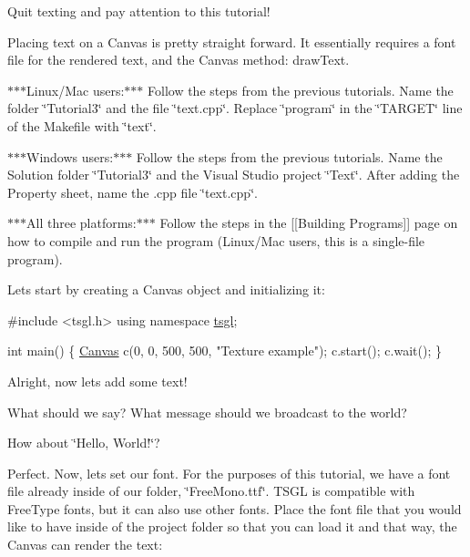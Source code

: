 Quit texting and pay attention to this tutorial!

Placing text on a Canvas is pretty straight forward. It essentially requires a font file for the rendered text, and the Canvas method\+: draw\+Text.

$\ast$$\ast$$\ast$\+Linux/\+Mac users\+:$\ast$$\ast$$\ast$ Follow the steps from the previous tutorials. Name the folder \char`\"{}\+Tutorial3\char`\"{} and the file \char`\"{}text.\+cpp\char`\"{}. Replace \char`\"{}program\char`\"{} in the \char`\"{}\+T\+A\+R\+G\+E\+T\char`\"{} line of the Makefile with \char`\"{}text\char`\"{}.

$\ast$$\ast$$\ast$\+Windows users\+:$\ast$$\ast$$\ast$ Follow the steps from the previous tutorials. Name the Solution folder \char`\"{}\+Tutorial3\char`\"{} and the Visual Studio project \char`\"{}\+Text\char`\"{}. After adding the Property sheet, name the .cpp file \char`\"{}text.\+cpp\char`\"{}.

$\ast$$\ast$$\ast$\+All three platforms\+:$\ast$$\ast$$\ast$ Follow the steps in the \mbox{[}\mbox{[}Building Programs\mbox{]}\mbox{]} page on how to compile and run the program (Linux/\+Mac users, this is a single-\/file program).

Let\textquotesingle{}s start by creating a Canvas object and initializing it\+:


\begin{DoxyCode}
\textcolor{preprocessor}{#include <tsgl.h>}
\textcolor{keyword}{using namespace }\hyperlink{namespacetsgl}{tsgl};

\textcolor{keywordtype}{int} main() \{
  \hyperlink{classtsgl_1_1_canvas}{Canvas} c(0, 0, 500, 500, \textcolor{stringliteral}{"Texture example"});
  c.start();
  c.wait();
\}
\end{DoxyCode}


Alright, now let\textquotesingle{}s add some text!

What should we say? What message should we broadcast to the world?

How about \char`\"{}\+Hello, World!\char`\"{}?

Perfect. Now, let\textquotesingle{}s set our font. For the purposes of this tutorial, we have a font file already inside of our folder, \char`\"{}\+Free\+Mono.\+ttf\char`\"{}. T\+S\+G\+L is compatible with Free\+Type fonts, but it can also use other fonts. Place the font file that you would like to have inside of the project folder so that you can load it and that way, the Canvas can render the text\+:


